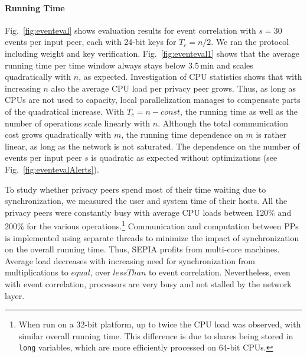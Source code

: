 \documentclass[letterpaper,11pt,onecolumn,titlepage]{article}
\begin{document}
\paragraph{Running Time}
Fig.~\ref{fig:eventeval} shows evaluation results for event correlation with $s=30$ events per input peer, each with 24-bit keys for $T_c=n/2$. We ran the protocol including weight and key verification.
Fig.~\ref{fig:eventeval1} shows that the average running time per time window always stays below 3.5\,min and scales quadratically with $n$, as expected. 
Investigation of CPU statistics shows that with increasing $n$ also the average CPU load per privacy peer grows. Thus, as long as CPUs are not used to capacity, local parallelization manages to compensate parts of the quadratical increase. With $T_c=n-const$, the running time as well as the number of operations scale linearly with $n$. 
Although the total communication cost grows quadratically with $m$, the running time dependence on $m$ is rather linear, as long as the network is not saturated.  The dependence on the number of events per input peer $s$ is quadratic as expected without optimizations (see Fig.~\ref{fig:eventevalAlerts}).

To study whether privacy peers spend most of their time waiting due to synchronization, we measured the user and system time of their hosts. All the privacy peers were constantly busy with average CPU loads between 120\% and 200\% for the various operations.\footnote{When run on a 32-bit platform, up to twice the CPU load was observed, with similar overall running time. This difference is due to shares being stored in \texttt{long} variables, which are more efficiently processed on 64-bit CPUs.} Communication and computation between PPs is implemented using separate threads to minimize the impact of synchronization on the overall running time. Thus, SEPIA profits from multi-core machines. Average load decreases with increasing need for synchronization from multiplications to $equal$, over $lessThan$ to event correlation. Nevertheless, even with event correlation, processors are very busy and not stalled by the network layer.
\end{document}
